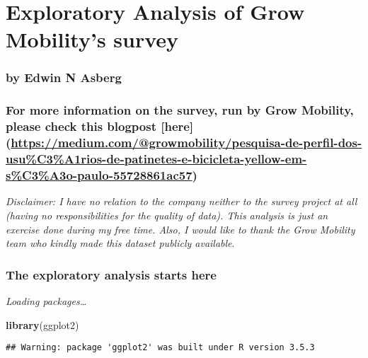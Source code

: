 \documentclass[]{article}
\title{}
\author{}
\date{}
\newenvironment{Shaded}{\begin{snugshade}}{\end{snugshade}}
\newcommand{\KeywordTok}[1]{\textcolor[rgb]{0.13,0.29,0.53}{\textbf{#1}}}
\newcommand{\NormalTok}[1]{#1}
\begin{document}
\section{Exploratory Analysis of Grow Mobility's
survey}\label{exploratory-analysis-of-grow-mobilitys-survey}

\subsubsection{by Edwin N Asberg}\label{by-edwin-n-asberg}

\subsubsection{\texorpdfstring{For more information on the survey, run
by Grow Mobility, please check this blogpost {[}here{]}
(\url{https://medium.com/@growmobility/pesquisa-de-perfil-dos-usu\%C3\%A1rios-de-patinetes-e-bicicleta-yellow-em-s\%C3\%A3o-paulo-55728861ac57})}{For more information on the survey, run by Grow Mobility, please check this blogpost {[}here{]} (https://medium.com/@growmobility/pesquisa-de-perfil-dos-usu\%C3\%A1rios-de-patinetes-e-bicicleta-yellow-em-s\%C3\%A3o-paulo-55728861ac57)}}\label{for-more-information-on-the-survey-run-by-grow-mobility-please-check-this-blogpost-here-httpsmedium.comgrowmobilitypesquisa-de-perfil-dos-usuc3a1rios-de-patinetes-e-bicicleta-yellow-em-sc3a3o-paulo-55728861ac57}

\emph{Disclaimer: I have no relation to the company neither to the
survey project at all (having no responsibilities for the quality of
data). This analysis is just an exercise done during my free time. Also,
I would like to thank the Grow Mobility team who kindly made this
dataset publicly available}.

\subsubsection{The exploratory analysis starts
here}\label{the-exploratory-analysis-starts-here}

\emph{Loading packages\ldots{}}

\begin{Shaded}
\begin{Highlighting}[]
\KeywordTok{library}\NormalTok{(ggplot2)}
\end{Highlighting}
\end{Shaded}

\begin{verbatim}
## Warning: package 'ggplot2' was built under R version 3.5.3
\end{verbatim}
\end{document}

